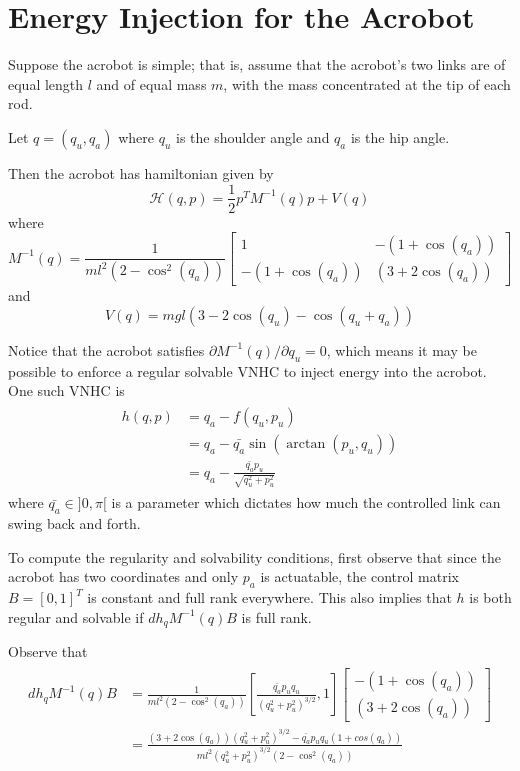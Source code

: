 
\section{Energy Injection for the Acrobot}
Suppose the acrobot is simple; 
that is, assume that the acrobot's two links are of equal length \(l\)
and of equal mass \(m\), with the mass concentrated at the tip of each rod.

Let \(q = (q_u,q_a)\) where \(q_u\) is the shoulder angle and \(q_a\) is the hip angle.

Then the acrobot has hamiltonian given by
\[
    \mathcal{H}(q,p) = \frac{1}{2} p^T M^{-1}(q) p + V(q)
\]
where
\[
    M^{-1}(q) = \frac{1}{m l^2 (2 - \cos^2(q_a))} 
    \begin{bmatrix}
        1              & -(1 + \cos(q_a)) \\
        -(1 + \cos(q_a)) & (3 + 2\cos(q_a))
    \end{bmatrix}
\]
and
\[
    V(q) = m g l (3 - 2 \cos(q_u) - \cos(q_u + q_a))
\]

Notice that the acrobot satisfies \(\partial M^{-1}(q)/ \partial q_u = 0\),
which means it may be possible to enforce a regular solvable VNHC to inject energy
into the acrobot.
One such VNHC is
\begin{align}\label{eqn:acrobot_vnhc}
    \begin{split}
    h(q,p) &= q_a - f(q_u,p_u) \\
           &= q_a - \bar{q_a}\sin(\arctan(p_u,q_u)) \\
           &= q_a - \frac{\bar{q_a}p_u}{\sqrt{q_u^2 + p_u^2}}
    \end{split}
\end{align}
where \(\bar{q_a} \in ]0,\pi[\) is a parameter which dictates how much the 
controlled link can swing back and forth.

To compute the regularity and solvability conditions, first observe that since
the acrobot has two coordinates and only \(p_a\) is actuatable, the control matrix
\(B = [0, 1]^T\) is constant and full rank everywhere. This also implies that
\(h\) is both regular and solvable if \(dh_q M^{-1}(q)B\) is full rank.

Observe that
\begin{align}
    \begin{split}
        dh_q M^{-1}(q)B &= \frac{1}{m l^2 (2 - \cos^2(q_a))}
\left[ \frac{\bar{q_a}p_uq_u}{(q_u^2 + p_u^2)^{3/2}}, 1\right] 
    \begin{bmatrix}
        -(1 + \cos(q_a)) \\
        (3 + 2\cos(q_a))
    \end{bmatrix} \\
                     &= \frac{ (3+2\cos(q_a))(q_u^2 + p_u^2)^{3/2} 
                     - \bar{q_a}p_uq_u(1+cos(q_a))}
                     {m l^2 (q_u^2+p_u^2)^{3/2} (2 - \cos^2(q_a))}
    \end{split}
\end{align}

